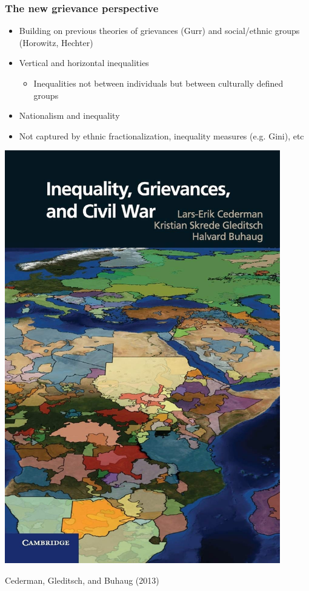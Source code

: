 \documentclass[aspectratio=43]{beamer}
\begin{document}
\begin{frame}
\frametitle{The new grievance perspective}
\centering

\begin{minipage}{0.6\textwidth}\centering
  \begin{itemize}
    \item Building on previous theories of grievances (Gurr) and social/ethnic groups (Horowitz, Hechter)
    \item Vertical and horizontal inequalities
    \begin{itemize}
      \item Inequalities not between individuals but between culturally defined groups
    \end{itemize}
    \item Nationalism and inequality
    \item Not captured by ethnic fractionalization, inequality measures (e.g. Gini), etc
  \end{itemize}
\end{minipage}\hfill
\begin{minipage}{0.39\textwidth}\centering
\includegraphics[width = 0.9\textwidth]{img/cgb}

{\small Cederman, Gleditsch, and Buhaug (2013)}
\end{minipage}

\end{frame}
\end{document}
